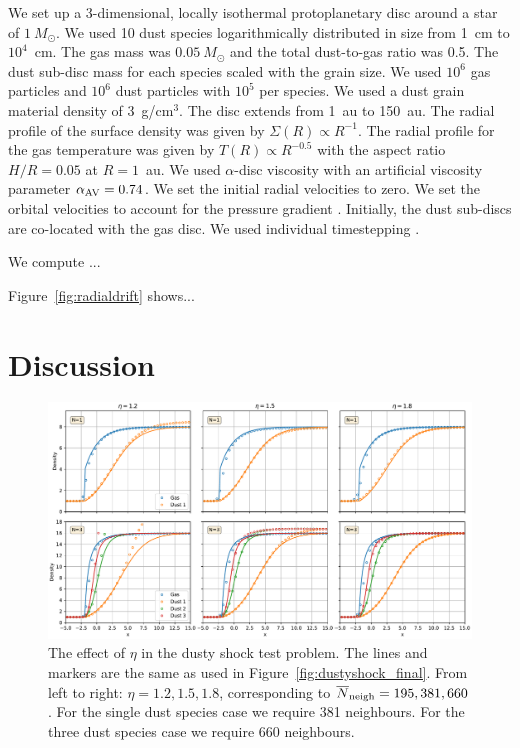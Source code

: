 \documentclass[fleqn,usenatbib]{mnras}
\begin{document}
We set up a 3-dimensional, locally isothermal protoplanetary disc around a star
of \(1~M_{\odot}\). We used 10 dust species logarithmically distributed in size
from 1~cm to \(10^4\)~cm. The gas mass was \(0.05~M_{\odot}\) and the total
dust-to-gas ratio was 0.5. The dust sub-disc mass for each species scaled with
the grain size. We used \(10^6\) gas particles and \(10^6\) dust particles with
\(10^5\) per species. We used a dust grain material density of 3~g/cm\({}^3\).
The disc extends from 1~au to 150~au. The radial profile of the surface density
was given by \(\Sigma(R) \propto R^{-1}\). The radial profile for the gas
temperature was given by \(T(R) \propto R^{-0.5}\) with the aspect ratio \(H/R =
0.05\) at \(R=1\)~au. We used \(\alpha\)-disc viscosity
\citep[Section~3.3.4]{Price2018PASA...35...31P} with an artificial viscosity
parameter \(\alpha_{\rm AV}=0.74\). We set the initial radial velocities to
zero. We set the orbital velocities to account for the pressure gradient
\citep[Section~3.3.2]{Price2018PASA...35...31P}. Initially, the dust sub-discs
are co-located with the gas disc. We used individual timestepping
\citep[Section~2.3.4]{Price2018PASA...35...31P}.

We compute ...

Figure~\ref{fig:radialdrift} shows...


\section{Discussion}%
\label{sec:discussion}

\begin{figure}
   \begin{center}
      \includegraphics[width=\textwidth]{figs/dustyshock_hfact.pdf}
      \caption{The effect of \(\eta\) in the dusty shock test problem.
         The lines and markers are the same as used in
         Figure~\ref{fig:dustyshock_final}. From left to right: \(\eta =
         1.2, 1.5, 1.8\), corresponding to \(\overline{N}_{\rm neigh} = 195,
         381, 660\). For the single dust species case we require 381 neighbours.
         For the three dust species case we require 660 neighbours.%
         \label{fig:dustyshock_hfact}}
   \end{center}
\end{figure}
\end{document}
